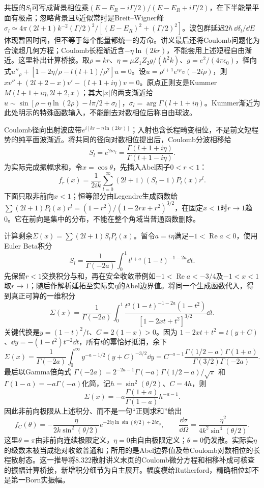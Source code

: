 共振的$S_l$可写成背景相位乘$(E-E_R-i\Gamma/2)/(E-E_R+i\Gamma/2)$，在下半能量平面有极点；忽略背景且$k$近似常时是Breit--Wigner峰$\sigma_l\simeq4\pi(2l+1)k^{-2}(\Gamma/2)^2/[(E-E_R)^2+(\Gamma/2)^2]$。波包群延迟$2\hbar\,\dd\delta_l/\dd E$体现暂困时间，但不等于每个能量都统一的寿命。讲义最后还将Coulomb问题化为合流超几何方程；Coulomb长程渐近含$-\eta\ln(2kr)$，不能套用上述短程自由渐近。这里补出计算桥接。取$\rho=kr$、$\eta=\mu Z_1Z_2g/(\hbar^2k)$、$g=e^2/(4\pi\epsilon_0)$，径向式$u''_\rho+[1-2\eta/\rho-l(l+1)/\rho^2]u=0$。设$u=\rho^{l+1}e^{i\rho}v(-2i\rho)$，则$xv''+(2l+2-x)v'-(l+1+i\eta)v=0$。原点正则支是Kummer $M(l+1+i\eta,2l+2,x)$；其大$|x|$的两支渐近给$u\sim\sin[\rho-\eta\ln(2\rho)-l\pi/2+\sigma_l]$，$\sigma_l=\arg\Gamma(l+1+i\eta)$。Kummer渐近为此处明示的特殊函数输入，不能删去对数相位后称自由球波。

Coulomb径向出射波应带$e^{i[kr-\eta\ln(2kr)]}$；入射也含长程畸变相位，不是前文短程势的纯平面波渐近。将共同的径向对数相位提出后，Coulomb分波相移给
\[
 S_l=e^{2i\sigma_l}=\frac{\Gamma(l+1+i\eta)}{\Gamma(l+1-i\eta)}.
\]
为实际完成振幅求和，令$x=\cos\theta$，先插入Abel因子$0<r<1$：
\[
 f_r(x)=\frac1{2ik}\sum_{l=0}^\infty(2l+1)(S_l-1)P_l(x)r^l.
\]
下面只取非前向$x<1$；恒等部分由Legendre生成函数给
$\sum(2l+1)P_l(x)r^l=(1-r^2)/(1-2rx+r^2)^{3/2}$，在固定$x<1$时$r\to1$趋0。它在前向是集中的分布，不能在整个角域当普通函数删除。

计算剩余$\Sigma(x)=\sum(2l+1)S_lP_l(x)$。暂令$a=i\eta$满足$-1<\operatorname{Re}a<0$，使用Euler Beta积分
\[
 S_l=\frac1{\Gamma(-2a)}\int_0^1t^{l+a}(1-t)^{-1-2a}\dd t.
\]
先保留$r<1$交换积分与和，再在安全收敛带例如$-1<\operatorname{Re}a<-3/4$及$-1<x<1$取$r\to1$；随后作解析延拓至实际实$\eta$的Abel边界值。将同一个生成函数代入，得到真正可算的一维积分
\[
 \Sigma(x)=\frac1{\Gamma(-2a)}\int_0^1
 \frac{t^a(1-t)^{-1-2a}(1-t^2)}{[1-2xt+t^2]^{3/2}}\dd t.
\]
关键代换是$y=(1-t)^2/t$、$C=2(1-x)>0$。因为
$1-2xt+t^2=t(y+C)$、$\dd y=-(1-t^2)t^{-2}\dd t$，所有$t$的幂恰好抵消，余下
\[
 \Sigma(x)=\frac1{\Gamma(-2a)}\int_0^\infty
 y^{-a-1/2}(y+C)^{-3/2}\dd y
 =C^{-a-1}\frac{\Gamma(1/2-a)\Gamma(1+a)}{\Gamma(3/2)\Gamma(-2a)}.
\]
最后以Gamma倍角式
$\Gamma(-2a)=2^{-2a-1}\Gamma(-a)\Gamma(1/2-a)/\sqrt\pi$
和$\Gamma(1-a)=-a\Gamma(-a)$化简，记$h=\sin^2(\theta/2)$、$C=4h$，则
\[
 \Sigma(x)=-a\frac{\Gamma(1+a)}{\Gamma(1-a)}h^{-a-1}.
\]
因此非前向极限从上述积分、而不是一句“正则求和”给出
\[
 f_C(\theta)=-\frac{\eta}{2k\sin^2(\theta/2)}
 e^{-2i\eta\ln\sin(\theta/2)+2i\sigma_0},\qquad
 \frac{\dd\sigma}{\dd\Omega}=\frac{\eta^2}{4k^2\sin^4(\theta/2)}.
\]
这里$\theta=\pi$由非前向连续极限定义，$\eta=0$由自由极限定义；$\theta=0$仍发散。实际实$\eta$的级数未被当成绝对收敛普通和；所用的是Abel边界值及带Coulomb对数相位的长程散射态。这一推导将8.322散射讲义末页的Coulomb微分方程和相移补成可核查的振幅计算桥接，新增积分细节为自主展开。幅度模给Rutherford，精确相位却不是第一Born实振幅。

